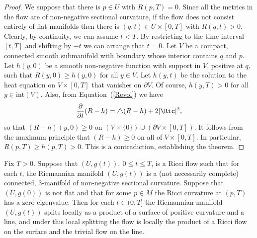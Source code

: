 \begin{proof}
We suppose that there is $p\in U$ with $R(p,T)=0$. Since all the
metrics in the flow are of non-negative sectional curvature, if the
flow does not consist entirely of flat manifolds then there is
$(q,t)\in U\times [0,T]$ with $R(q,t)>0$. Clearly, by continuity, we
can assume $t<T$. By restricting to the time interval $[t,T]$ and
shifting by $-t$ we can arrange that $t=0$. Let $V$ be a compact,
connected smooth submanifold with boundary whose interior contains
$q$ and $p$. Let $h(y,0)$ be a smooth non-negative function with
support in $V$, positive at $q$, such that $R(y,0)\ge h(y,0)$ for
all $y\in V$. Let $h(y,t)$ be the solution to the heat equation on
$V\times [0,T]$ that vanishes on $\partial V$. Of course, $h(y,T)>0$
for all $y\in \mathrm{int}(V)$. Also, from Equation~(\ref{Revol}) we
have
$$\frac{\partial}{\partial t}(R-h)=\triangle (R-h)+2|\Ric|^2,$$
so that $(R-h)(y,0)\ge 0$ on $(V\times \{0\})\cup (\partial V\times [0,T])$. It
follows from the  maximum principle that $(R-h)\ge 0$ on all of $V\times
[0,T]$. In particular, $R(p,T)\ge h(p,T)>0$. This is a contradiction,
establishing the theorem.
\end{proof}

\begin{corollary}
\label{cor:local-product-splitting-ricci-null-eigenvalue}
\label{localprod}
Fix $T>0$. Suppose that $(U,g(t)),\ 0\le t\le T$, is a  Ricci flow
such that for each $t$, the Riemannian manifold  $(U,g(t))$ is a
(not necessarily complete) connected, $3$-manifold of non-negative
sectional curvature. Suppose that $(U,g(0))$ is not flat and that
for some $p\in M$ the Ricci curvature at $(p,T)$ has a zero
eigenvalue. Then for each $t\in (0,T]$ the Riemannian manifold
$(U,g(t))$ splits locally as a product of a surface of positive
curvature and a line, and under this local splitting the flow is
locally the product of a Ricci flow on the surface and the trivial
flow on the line.
\end{corollary}

